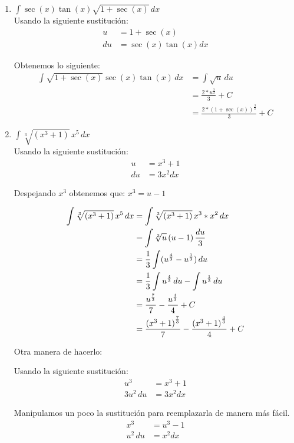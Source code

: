 \documentclass[a4paper,10pt]{article}
\newcommand{\dis}{\displaystyle}
\begin{document}
\begin{enumerate}[label=\emph{\alph*)}]
\item $\dis \int \sec(x) \tan(x)\sqrt{1+\sec(x)}\, dx$\\

Usando la siguiente sustitución:
\begin{align*}
u &= 1+\sec(x) \\
du &= \sec(x) \tan(x) dx
\end{align*}

Obtenemos lo siguiente:
\begin{align*}
 \dis \int \sqrt{1+\sec(x)} \sec(x) \tan(x)\, dx &= \dis \int \sqrt{u} \, du \\
      &=  \frac{2*u^{\frac{3}{2}}}{3} + C\\
       &=  \frac{2*{(1+\sec(x))}^{\frac{3}{2}}}{3} + C
\end{align*}

\item $\dis \int \sqrt[3]{(x^3+1)}\, x^5\, dx$\\
Usando la siguiente sustitución:
\begin{align*}
u &= x^3+1 \\
du &= 3x^2 dx
\end{align*}

Despejando $x^3$ obtenemos que: $x^3 = u - 1$

\begin{align*}
 \dis \dis \int \sqrt[3]{(x^3+1)}\, x^5\, dx &= \dis \int \sqrt[3]{(x^3+1)}\, x^3* x^2\, dx \\
      &=  \dis \int \sqrt[3]{u}\, (u-1)\, \frac{du}{3}\\
       &=  \frac{1}{3}\int (u^{\frac{4}{3}} - u^{\frac{1}{3}}) \, du\\
       &=  \frac{1}{3}\int u^{\frac{4}{3}}\, du - \int u^{\frac{1}{3}} \, du\\
 	   &=   \frac{u^{\frac{7}{3}}}{7}  - \frac{u^{\frac{4}{3}}}{4} + C\\
       &=   \frac{{(x^3+1)}^{\frac{7}{3}}}{7}  - \frac{{(x^3+1)}^{\frac{4}{3}}}{4} + C
\end{align*}


Otra manera de hacerlo:

Usando la siguiente sustitución:
\begin{align*}
u^3 &= x^3+1 \\
3u^2 \, du &= 3x^2 dx
\end{align*}

Manipulamos un poco la sustitución para reemplazarla de manera más fácil.
\begin{align*}
x^3 &= u^3-1 \\
u^2 \, du &= x^2 dx
\end{align*}


\end{enumerate}
\end{document}
